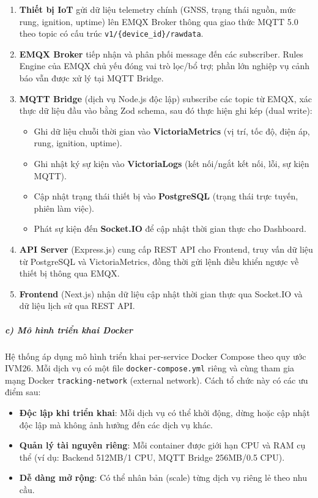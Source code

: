 \documentclass[13pt,a4paper]{extarticle}
\renewcommand{\\}{\thesislongtableorignewline\hline}%
\providecommand{\tightlist}{%
  \setlength{\itemsep}{0pt}\setlength{\parskip}{0pt}}
\begin{document}
\begin{enumerate}
\def\labelenumi{\arabic{enumi}.}
\tightlist
\item
  \textbf{Thiết bị IoT} gửi dữ liệu telemetry chính (GNSS, trạng thái
  nguồn, mức rung, ignition, uptime) lên EMQX Broker thông qua giao thức
  MQTT 5.0 theo topic có cấu trúc \texttt{v1/\{device\_id\}/rawdata}.
\item
  \textbf{EMQX Broker} tiếp nhận và phân phối message đến các
  subscriber. Rules Engine của EMQX chủ yếu đóng vai trò lọc/bổ trợ;
  phần lớn nghiệp vụ cảnh báo vẫn được xử lý tại MQTT Bridge.
\item
  \textbf{MQTT Bridge} (dịch vụ Node.js độc lập) subscribe các topic từ
  EMQX, xác thực dữ liệu đầu vào bằng Zod schema, sau đó thực hiện ghi
  kép (dual write):

  \begin{itemize}
  \tightlist
  \item
    Ghi dữ liệu chuỗi thời gian vào \textbf{VictoriaMetrics} (vị trí,
    tốc độ, điện áp, rung, ignition, uptime).
  \item
    Ghi nhật ký sự kiện vào \textbf{VictoriaLogs} (kết nối/ngắt kết nối,
    lỗi, sự kiện MQTT).
  \item
    Cập nhật trạng thái thiết bị vào \textbf{PostgreSQL} (trạng thái
    trực tuyến, phiên làm việc).
  \item
    Phát sự kiện đến \textbf{Socket.IO} để cập nhật thời gian thực cho
    Dashboard.
  \end{itemize}
\item
  \textbf{API Server} (Express.js) cung cấp REST API cho Frontend, truy
  vấn dữ liệu từ PostgreSQL và VictoriaMetrics, đồng thời gửi lệnh điều
  khiển ngược về thiết bị thông qua EMQX.
\item
  \textbf{Frontend} (Next.js) nhận dữ liệu cập nhật thời gian thực qua
  Socket.IO và dữ liệu lịch sử qua REST API.
\end{enumerate}

\subparagraph{c) Mô hình triển khai
Docker}\label{c-muxf4-huxecnh-triux1ec3n-khai-docker}

Hệ thống áp dụng mô hình triển khai per-service Docker Compose theo quy
ước IVM26. Mỗi dịch vụ có một file \texttt{docker-compose.yml} riêng và
cùng tham gia mạng Docker \texttt{tracking-network} (external network).
Cách tổ chức này có các ưu điểm sau:

\begin{itemize}
\tightlist
\item
  \textbf{Độc lập khi triển khai}: Mỗi dịch vụ có thể khởi động, dừng
  hoặc cập nhật độc lập mà không ảnh hưởng đến các dịch vụ khác.
\item
  \textbf{Quản lý tài nguyên riêng}: Mỗi container được giới hạn CPU và
  RAM cụ thể (ví dụ: Backend 512MB/1 CPU, MQTT Bridge 256MB/0.5 CPU).
\item
  \textbf{Dễ dàng mở rộng}: Có thể nhân bản (scale) từng dịch vụ riêng
  lẻ theo nhu cầu.
\end{itemize}
\end{document}
